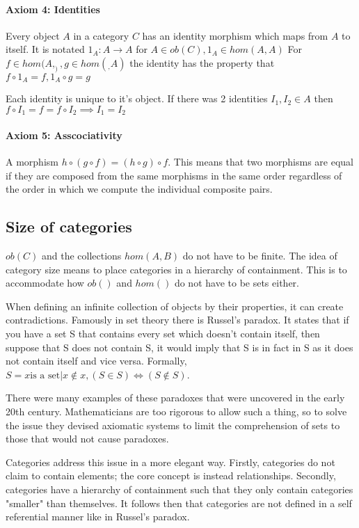 \documentclass[10pt,a4paper]{amsart}
\begin{document}
\paragraph{Axiom 4: Identities}
Every object $A$ in a category $C$ has an identity morphism which maps from $A$ to itself.
It is notated $1_A: A\to A$ for $A\in ob(C), 1_A\in hom(A,A)$
For $f\in hom(A,_), g\in hom(_,A)$ the identity has the property that $f\circ 1_A = f, 1_A\circ g = g$

Each identity is unique to it's object. If there was 2 identities $I_1,I_2\in A$ then $f\circ I_1 = f = f\circ I_2 \implies I_1=I_2$
\paragraph{Axiom 5: Asscociativity}
A morphism $h\circ(g\circ f) = (h\circ g)\circ f$. 
This means that two morphisms are equal if they are composed from the same morphisms in the same order
regardless of the order in which we compute the individual composite pairs.
\subsection{Size of categories}
$ob(C)$ and the collections $hom(A,B)$ do not have to be finite.
The idea of category size means to place categories in a hierarchy of containment.
This is to accommodate how $ob()$ and $hom()$ do not have to be sets either.

When defining an infinite collection of objects by their properties, it can create contradictions.
Famously in set theory there is Russel's paradox.
It states that if you have a set S that contains every set which doesn't contain itself,
then suppose that S does not contain S, 
it would imply that S is in fact in S as it does not contain itself and vice versa.
Formally, $S = {x \text{is a set} | x\notin x}, (S\in S) \iff (S\notin S)$.

There were many examples of these paradoxes
that were uncovered in the early 20th century.
Mathematicians are too rigorous to allow such a thing,
so to solve the issue they devised axiomatic systems to limit the comprehension of sets to those that would not cause paradoxes.

Categories address this issue in a more elegant way.
Firstly, categories do not claim to contain elements; the core concept is instead relationships.
Secondly, categories have a hierarchy of containment such that they only contain categories "smaller" than themselves.
It follows then that categories are not defined in a self referential manner like in Russel's paradox.
\end{document}
